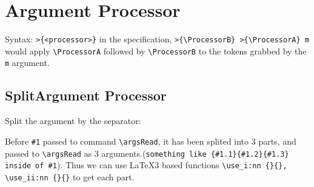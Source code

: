 \documentclass{article}
\begin{document}


\section{Argument Processor}
Syntax: \verb|>{<processor>}| in the specification, \verb|>{\ProcessorB} >{\ProcessorA} m| would apply 
\verb|\ProcessorA| followed by \verb|\ProcessorB| to the tokens grabbed by the \texttt{m} argument.

\subsection{SplitArgument Processor}
Split the argument by the separator:

Before \verb|#1| passed to command \verb|\argsRead|, it has been splited into 3 parts, and passed to 
\verb|\argsRead| as 3 arguments.(\verb|something like {#1.1}{#1.2}{#1.3} inside of #1|). Thus we can use 
\LaTeX3 based functions \verb|\use_i:nn {}{}, \use_ii:nn {}{}| to get each part.
\end{document}
